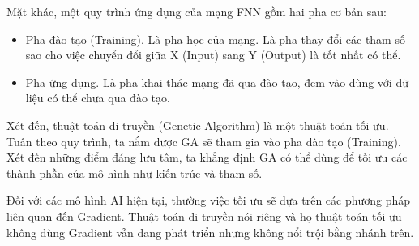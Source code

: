 	Mặt khác, một quy trình ứng dụng của mạng FNN gồm hai pha cơ bản sau:
	\begin{itemize}
		\item Pha đào tạo (Training). Là pha học của mạng. Là pha thay đổi các tham số sao cho việc chuyển đổi giữa X (Input) sang Y (Output) là tốt nhất có thể. \cite{kak1993training}
		\item Pha ứng dụng. Là pha khai thác mạng đã qua đào tạo, đem vào dùng với dữ liệu có thể chưa qua đào tạo.
	\end{itemize}
	
	Xét đến, thuật toán di truyền (Genetic Algorithm) là một thuật toán tối ưu. Tuân theo quy trình, ta nắm được GA sẽ tham gia vào pha đào tạo (Training). Xét đến những điểm đáng lưu tâm, ta khẳng định GA có thể dùng để tối ưu các thành phần của mô hình như kiến trúc và tham số. \cite{montana1989training}
	
\noindent

Đối với các mô hình AI hiện tại, thường việc tối ưu sẽ dựa trên các phương pháp liên quan đến Gradient. Thuật toán di truyền nói riêng và họ thuật toán tối ưu không dùng Gradient vẫn đang phát triển nhưng không nổi trội bằng nhánh trên.